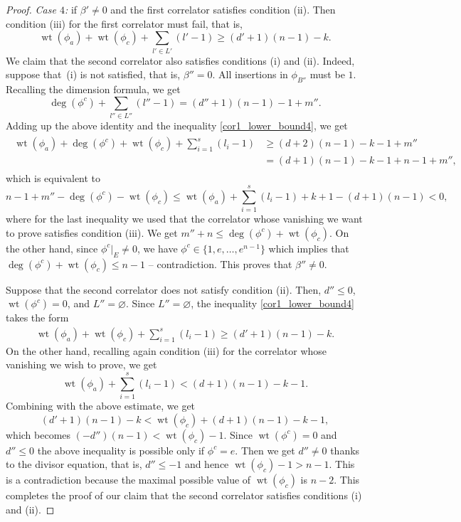\documentclass[10pt,a4paper]{article}
\numberwithin{equation}{section}
\begin{document}
\begin{proof}
{\em Case $4$:} if $\beta'\neq 0$ and the first correlator satisfies condition (ii). Then condition (iii) for the first correlator must fail, that is,
\begin{equation}\label{cor1_lower_bound4}
\operatorname{wt}(\phi_a) + \operatorname{wt}(\phi_c) +\sum_{l'\in L'} (l'-1)
\geq (d'+1)(n-1) - k.
\end{equation}
We claim that the second correlator also satisfies conditions (i) and (ii). Indeed, suppose that~(i) is not satisfied, that is, $\beta''=0$. All insertions in $\phi_{B''}$ must be $1$. Recalling the dimension formula, we get
\[
\operatorname{deg}(\phi^c)+\sum_{l''\in L''} (l''-1) = (d''+1)(n-1) -1 + m''.
\]
Adding up the above identity and the inequality \eqref{cor1_lower_bound4}, we get
\begin{align*}
\begin{aligned}
\operatorname{wt}(\phi_a) + \operatorname{deg}(\phi^c)+ \operatorname{wt}(\phi_c) +
\sum_{i=1}^s (l_i-1) &\geq (d+2)(n-1) - k-1+m'' \\
&=
(d+1)(n-1) -k-1 + n-1+m'',
\end{aligned}
\end{align*}
which is equivalent to
\[
n-1+m''- \operatorname{deg}(\phi^c)- \operatorname{wt}(\phi_c)\leq
\operatorname{wt}(\phi_a) + \sum_{i=1}^s (l_i-1)+k+1 - (d+1)(n-1)<0,
\]
where for the last inequality we used that the correlator whose vanishing we want to prove satisfies condition (iii). We get $m''+n\leq \operatorname{deg}(\phi^c)+ \operatorname{wt}(\phi_c)$. On the other hand, since $\phi^c|_{E}\neq 0$, we have $\phi^c\in \big\{1,e,\dots, e^{n-1}\big\}$ which implies that $\operatorname{deg}(\phi^c)+ \operatorname{wt}(\phi_c)\leq n-1$ -- contradiction. This proves that $\beta''\neq 0$.

Suppose that the second correlator does not satisfy condition (ii). Then, $d''\leq 0$, $\operatorname{wt}(\phi^c)=0$, and $L''=\varnothing$. Since $L''=\varnothing$, the inequality \eqref{cor1_lower_bound4} takes the form
\begin{align*}
\operatorname{wt}(\phi_a) + \operatorname{wt}(\phi_c) +\sum_{i=1}^s (l_i-1)
\geq (d'+1)(n-1) - k.
\end{align*}
On the other hand, recalling again condition (iii) for the correlator whose vanishing we wish to prove, we get \[
\operatorname{wt}(\phi_a) +\sum_{i=1}^s (l_i-1) <(d+1)(n-1)-k-1.\] Combining with the above estimate, we get
\[
(d'+1)(n-1)-k < \operatorname{wt}(\phi_c) + (d+1)(n-1)-k-1,
\]
which becomes $(-d'')(n-1)< \operatorname{wt}(\phi_c) -1$. Since $\operatorname{wt}(\phi^c)=0$ and $d''\leq 0$ the above inequality is possible only if $\phi^c=e$. Then we get $d''\neq 0$ thanks to the divisor equation, that is, $d''\leq -1$ and hence $ \operatorname{wt}(\phi_c) -1> n-1$. This is a contradiction because the maximal possible value of $\operatorname{wt}(\phi_c)$ is $n-2$. This completes the proof of our claim that the second correlator satisfies conditions (i) and (ii).


\end{proof}
\end{document}
